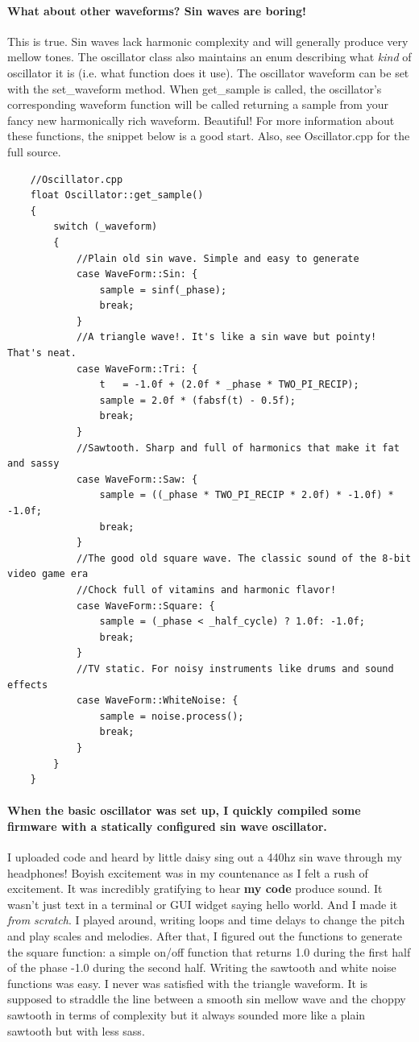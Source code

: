 \documentclass[acmlarge,screen]{acmart}
\begin{document}
	\paragraph{What about other waveforms? Sin waves are boring!} This is true. Sin waves lack harmonic complexity and will generally produce very mellow tones. The oscillator class also maintains an enum describing what \textit{kind} of oscillator it is (i.e. what function does it use). The oscillator waveform can be set with the set\_waveform method. When get\_sample is called, the oscillator's corresponding waveform function will be called returning a sample from your fancy new harmonically rich waveform. Beautiful! For more information about these functions, the snippet below is a good start. Also, see Oscillator.cpp for the full source.
	
	\clearpage

	\begin{verbatim}
	//Oscillator.cpp
	float Oscillator::get_sample()
	{
		switch (_waveform)
		{
			//Plain old sin wave. Simple and easy to generate
			case WaveForm::Sin: {
				sample = sinf(_phase);
				break;
			}
			//A triangle wave!. It's like a sin wave but pointy! That's neat.
			case WaveForm::Tri: {
				t   = -1.0f + (2.0f * _phase * TWO_PI_RECIP);
				sample = 2.0f * (fabsf(t) - 0.5f);
				break;
			}
			//Sawtooth. Sharp and full of harmonics that make it fat and sassy
			case WaveForm::Saw: {
				sample = ((_phase * TWO_PI_RECIP * 2.0f) * -1.0f) * -1.0f;
				break;
			}
			//The good old square wave. The classic sound of the 8-bit video game era
			//Chock full of vitamins and harmonic flavor!
			case WaveForm::Square: {
				sample = (_phase < _half_cycle) ? 1.0f: -1.0f;
				break;
			}
			//TV static. For noisy instruments like drums and sound effects
			case WaveForm::WhiteNoise: {
				sample = noise.process();
				break;
			}
		}
	}
	\end{verbatim}
	
	\paragraph{When the basic oscillator was set up, I quickly compiled some firmware with a statically configured sin wave oscillator.} I uploaded code and heard by little daisy sing out a 440hz sin wave through my headphones! Boyish excitement was in my countenance as I felt a rush of excitement. It was incredibly gratifying to hear \textbf{my code} produce sound. It wasn't just text in a terminal or GUI widget saying hello world. And I made it \textit{from scratch}. I played around, writing loops and time delays to change the pitch and play scales and melodies. After that, I figured out the functions to generate the square function: a simple on/off function that returns 1.0 during the first half of the phase -1.0 during the second half. Writing the sawtooth and white noise functions was easy. I never was satisfied with the triangle waveform. It is supposed to straddle the line between a smooth sin mellow wave and the choppy sawtooth in terms of complexity but it always sounded more like a plain sawtooth but with less sass.
	
\end{document}
